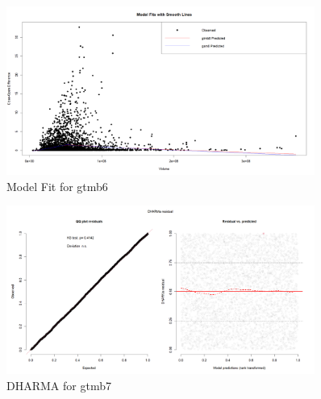 \begin{figure}[h]
    \centering
    \includegraphics[width=0.9\textwidth]{visuals/model_fit_gtmb6.png}
    \caption{Model Fit for gtmb6}
    \label{fig:modfitgtmb6}
\end{figure}

\begin{figure}[h]
    \centering
    \includegraphics[width=0.9\textwidth]{visuals/DHARMa_gtmb7.png}
    \caption{DHARMA for gtmb7}
    \label{fig:dharmagtmb7}
\end{figure}

